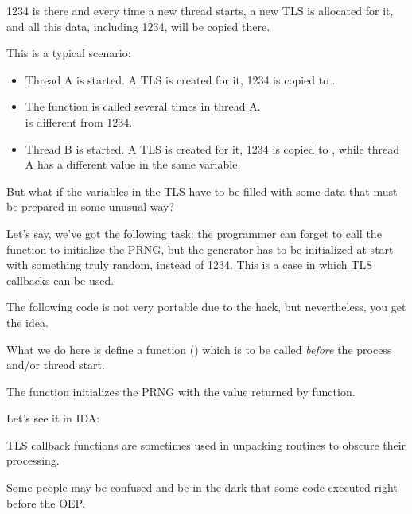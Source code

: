 1234 is there and every time a new thread starts, a new \ac{TLS} is allocated for it, 
and all this data, including 1234, will be copied there.

This is a typical scenario:

\begin{itemize}
\item Thread A is started. A \ac{TLS} is created for it, 1234 is copied to .

\item The  function is called several times in thread A.\\
 is different from 1234.

\item Thread B is started. A \ac{TLS} is created for it, 1234 is copied to , 
while thread A has a different value in the same variable.
\end{itemize}


But what if the variables in the \ac{TLS} have to be filled with some data that must be prepared in some unusual way?

Let's say, we've got the following task:
the programmer can forget to call the  function to initialize the \ac{PRNG}, but the generator has to be 
initialized at start with something truly random, instead of 1234.
This is a case in which \ac{TLS} callbacks can be used.

The following code is not very portable due to the hack, but nevertheless, you get the idea.

What we do here is define a function () which is to be called \emph{before} 
the process and/or thread start.

The function initializes the \ac{PRNG} with the value returned by  function.



Let's see it in IDA:



TLS callback functions are sometimes used in unpacking routines to obscure their processing.

Some people may be confused and be in the dark that some code executed right before the \ac{OEP}.
